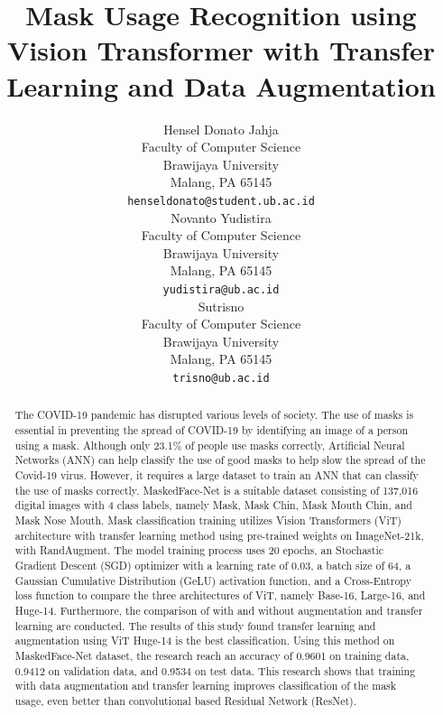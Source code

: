 \documentclass{article}
\title{Mask Usage Recognition using Vision Transformer with Transfer Learning and Data Augmentation}
\author{
 Hensel Donato Jahja \\
  Faculty of Computer Science\\
  Brawijaya University\\
  Malang, PA 65145 \\
  \texttt{henseldonato@student.ub.ac.id} \\
   \And
 Novanto Yudistira \\
Faculty of Computer Science\\
  Brawijaya University\\
  Malang, PA 65145 \\
  \texttt{yudistira@ub.ac.id} \\
  \And
 Sutrisno \\
Faculty of Computer Science\\
  Brawijaya University\\
  Malang, PA 65145 \\
  \texttt{trisno@ub.ac.id} \\
}
\begin{document}
\maketitle
\begin{abstract}
	The COVID-19 pandemic has disrupted various levels of society. The use of masks is essential in preventing the spread of COVID-19 by identifying an image of a person using a mask. Although only 23.1\% of people use masks correctly, Artificial Neural Networks (ANN) can help classify the use of good masks to help slow the spread of the Covid-19 virus. However, it requires a large dataset to train an ANN that can classify the use of masks correctly. MaskedFace-Net is a suitable dataset consisting of 137,016 digital images with 4 class labels, namely Mask, Mask Chin, Mask Mouth Chin, and Mask Nose Mouth. Mask classification training utilizes Vision Transformers (ViT) architecture with transfer learning method using pre-trained weights on ImageNet-21k, with RandAugment. The model training process uses 20 epochs, an Stochastic Gradient Descent (SGD) optimizer with a learning rate of 0.03, a batch size of 64, a Gaussian Cumulative Distribution (GeLU) activation function, and a Cross-Entropy loss function to compare the three architectures of ViT, namely Base-16, Large-16, and Huge-14. Furthermore, the comparison of with and without augmentation and transfer learning are conducted. The results of this study found transfer learning and augmentation using ViT Huge-14 is the best classification. Using this method on MaskedFace-Net dataset, the research reach an accuracy of 0.9601 on training data, 0.9412 on validation data, and 0.9534 on test data. This research shows that training with data augmentation and transfer learning improves classification of the mask usage, even better than convolutional based Residual Network (ResNet).
\end{abstract}


\end{document}
